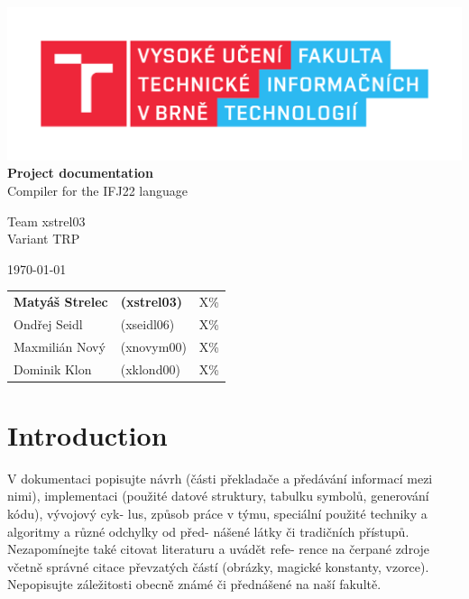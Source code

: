 \documentclass[11pt,a4paper]{article}
\begin{document}
    \begin{titlepage}
        \begin{center}
            \includegraphics[scale=0.65]{include/fit.pdf} \\

            \LARGE{
                \textbf{
                    Project documentation} \\
                Compiler for the IFJ22 language} \\
                
            \vspace{2cm}
            
            \Large{
                Team xstrel03 \\
                Variant TRP \\
            }
                
            \vspace{2cm}
            
            \normalsize{}
            \today{}

            \vspace{2cm}

            \begin{tabular}{l l l}
                \textbf{Matyáš Strelec} & \textbf{(xstrel03)}   & \quad X\% \\
                Ondřej Seidl            & (xseidl06)            & \quad X\% \\
                Maxmilián Nový          & (xnovym00)            & \quad X\% \\
                Dominik Klon            & (xklond00)            & \quad X\% \\
            \end{tabular}
        \end{center}
    \end{titlepage}

    \tableofcontents

    \newpage{}

    \section{Introduction}
    V dokumentaci popisujte návrh (části překladače a předávání informací mezi nimi),
    implementaci (použité datové struktury, tabulku symbolů, generování kódu),
    vývojový cyk- lus, způsob práce v týmu, speciální použité techniky a algoritmy
    a různé odchylky od před- nášené látky či tradičních přístupů. Nezapomínejte také
    citovat literaturu a uvádět refe- rence na čerpané zdroje včetně správné citace
    převzatých částí (obrázky, magické konstanty, vzorce). Nepopisujte záležitosti
    obecně známé či přednášené na naší fakultě.
\end{document}
